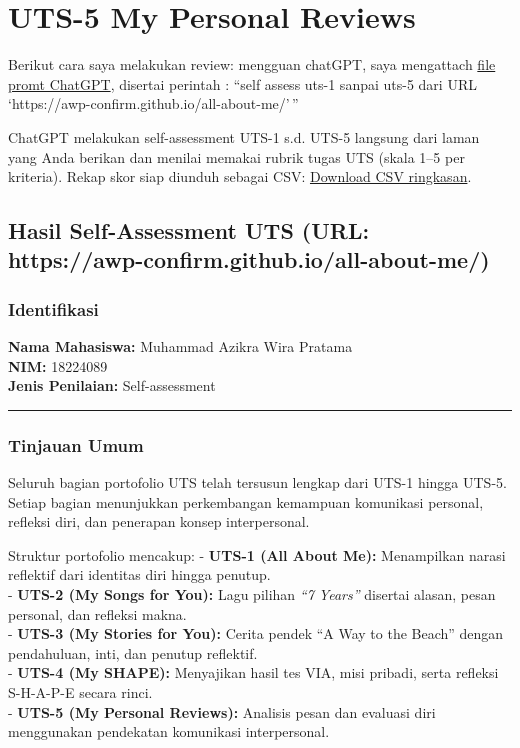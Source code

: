 \documentclass[
  letterpaper,
  DIV=11,
  numbers=noendperiod]{scrreprt}
\begin{document}

\chapter{UTS-5 My Personal Reviews}\label{uts-5-my-personal-reviews}

Berikut cara saya melakukan review: mengguan chatGPT, saya mengattach
\href{skor_uts.pdf}{file promt ChatGPT}, disertai perintah : ``self
assess uts-1 sanpai uts-5 dari URL
`https://awp-confirm.github.io/all-about-me/'\,''

ChatGPT melakukan self-assessment UTS-1 s.d. UTS-5 langsung dari laman
yang Anda berikan dan menilai memakai rubrik tugas UTS (skala 1--5 per
kriteria). Rekap skor siap diunduh sebagai CSV:
\href{Self-Assessment_UTS-1_s_d__UTS-5__dibuat_otomatis_.csv}{Download
CSV ringkasan}.

\section{Hasil Self-Assessment UTS (URL:
https://awp-confirm.github.io/all-about-me/)}\label{hasil-self-assessment-uts-url-httpsawp-confirm.github.ioall-about-me}

\subsection*{Identifikasi}\label{identifikasi}

\textbf{Nama Mahasiswa:} Muhammad Azikra Wira Pratama\\
\textbf{NIM:} 18224089\\
\textbf{Jenis Penilaian:} Self-assessment

\begin{center}\rule{0.5\linewidth}{0.5pt}\end{center}

\subsection*{Tinjauan Umum}\label{tinjauan-umum}

Seluruh bagian portofolio UTS telah tersusun lengkap dari UTS-1 hingga
UTS-5.\\
Setiap bagian menunjukkan perkembangan kemampuan komunikasi personal,
refleksi diri, dan penerapan konsep interpersonal.

Struktur portofolio mencakup: - \textbf{UTS-1 (All About Me):}
Menampilkan narasi reflektif dari identitas diri hingga penutup.\\
- \textbf{UTS-2 (My Songs for You):} Lagu pilihan \emph{``7 Years''}
disertai alasan, pesan personal, dan refleksi makna.\\
- \textbf{UTS-3 (My Stories for You):} Cerita pendek ``A Way to the
Beach'' dengan pendahuluan, inti, dan penutup reflektif.\\
- \textbf{UTS-4 (My SHAPE):} Menyajikan hasil tes VIA, misi pribadi,
serta refleksi S-H-A-P-E secara rinci.\\
- \textbf{UTS-5 (My Personal Reviews):} Analisis pesan dan evaluasi diri
menggunakan pendekatan komunikasi interpersonal.
\end{document}
